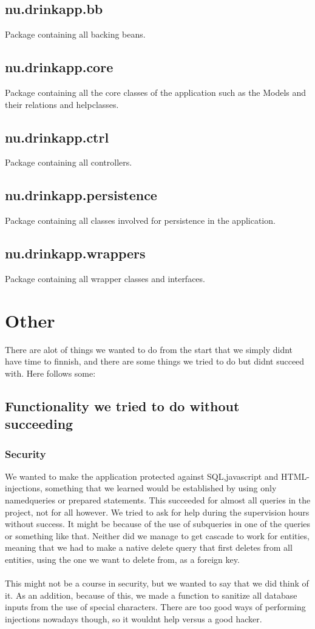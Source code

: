 \documentclass[a4paper]{article}
\begin{document}
\subsection{nu.drinkapp.bb}
Package containing all backing beans.

\subsection{nu.drinkapp.core}
Package containing all the core classes of the application such as the Models and their relations and helpclasses.

\subsection{nu.drinkapp.ctrl}
Package containing all controllers.

\subsection{nu.drinkapp.persistence}
Package containing all classes involved for persistence in the application.

\subsection{nu.drinkapp.wrappers}
Package containing all wrapper classes and interfaces.

\section{Other}
There are alot of things we wanted to do from the start that we simply didnt have time to finnish, and there are some things we tried to do but didnt succeed with. Here follows some:

\subsection{Functionality we tried to do without succeeding}

\subsubsection{Security}
We wanted to make the application protected against SQL,javascript and HTML-injections, something that we learned would be established by using only namedqueries or prepared statements. This succeeded for almost all queries in the project, not for all however. We tried to ask for help during the supervision hours without success. It might be because of the use of subqueries in one of the queries or something like that. Neither did we manage to get cascade to work for entities, meaning that we had to make a native delete query that first deletes from all entities, using the one we want to delete from, as a foreign key. \\
\\
This might not be a course in security, but we wanted to say that we did think of it.
As an addition, because of this, we made a function to sanitize all database inputs from the use of special characters. There are too good ways of performing injections nowadays though, so it wouldnt help versus a good hacker.
\end{document}
